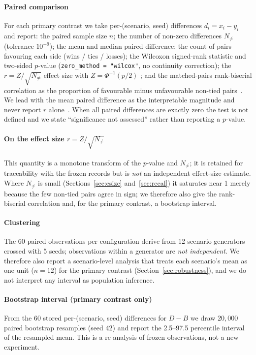 \documentclass[conference]{IEEEtran}
\newcommand{\code}[1]{\texttt{#1}}
\newcommand{\Nnz}{N_{\neq}}                 %
\newcommand{\rzn}{r=Z/\sqrt{\Nnz}}
\begin{document}
\paragraph{Paired comparison}
For each primary contrast we take per-(scenario, seed) differences
$d_i = x_i - y_i$ and report: the paired sample size $n$; the number of non-zero
differences $\Nnz$ (tolerance $10^{-9}$); the mean and median paired difference;
the count of pairs favouring each side (wins / ties / losses); the Wilcoxon
signed-rank statistic and two-sided $p$-value (\code{zero\_method = "wilcox"}, no
continuity correction); the $\rzn$ effect size with $Z = \Phi^{-1}(p/2)$
\cite{Fritz2012}; and the matched-pairs rank-biserial correlation as the
proportion of favourable minus unfavourable non-tied pairs~\cite{Kerby2014}. We
lead with the mean paired difference as the interpretable magnitude and never
report $r$ alone~\cite{Wasserstein2016}. When all paired differences are exactly
zero the test is not defined and we state ``significance not assessed'' rather
than reporting a $p$-value.

\paragraph{On the effect size $\rzn$}
This quantity is a monotone transform of the $p$-value and $\Nnz$; it is
retained for traceability with the frozen records but is \emph{not} an
independent effect-size estimate. Where $\Nnz$ is small
(Sections~\ref{sec:esize} and~\ref{sec:recal}) it saturates near 1 merely
because the few non-tied pairs agree in sign; we therefore also give the
rank-biserial correlation and, for the primary contrast, a bootstrap interval.

\paragraph{Clustering}
The 60 paired observations per configuration derive from 12 scenario generators
crossed with 5 seeds; observations within a generator are \emph{not
independent}. We therefore also report a scenario-level analysis that treats
each scenario's mean as one unit ($n = 12$) for the primary contrast
(Section~\ref{sec:robustness}), and we do not interpret any interval as
population inference.

\paragraph{Bootstrap interval (primary contrast only)}
From the 60 stored per-(scenario, seed) differences for $D - B$ we draw
$20{,}000$ paired bootstrap resamples (seed 42) and report the 2.5--97.5
percentile interval of the resampled mean. This is a re-analysis of frozen
observations, not a new experiment.
\end{document}
